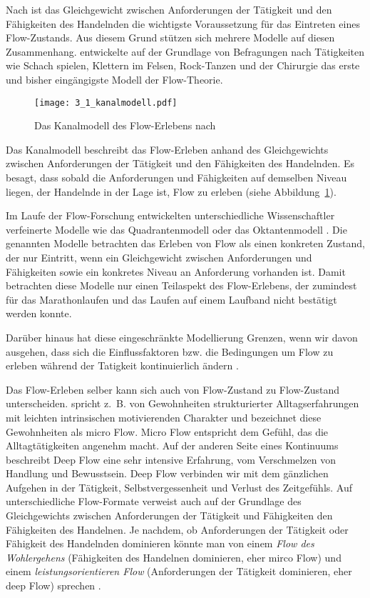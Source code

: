 Nach \citet[]{Csikszentmihalyi2010} ist das Gleichgewicht zwischen Anforderungen der Tätigkeit und den Fähigkeiten des Handelnden die wichtigste Voraussetzung für das Eintreten eines Flow-Zustands. Aus diesem Grund stützen sich mehrere Modelle auf diesen Zusammenhang. \citet[S.~75]{Csikszentmihalyi2010} entwickelte auf der Grundlage von Befragungen nach Tätigkeiten wie Schach spielen, Klettern im Felsen, Rock-Tanzen und der Chirurgie das erste und bisher eingängigste Modell der Flow-Theorie.
\begin{figure}
	[!htb] \centering 
	\texttt{[image: 3\_1\_kanalmodell.pdf]} \caption[Das Kanalmodell des Flow-Erlebens]{Das Kanalmodell des Flow-Erlebens nach \citet[S.~75]{Csikszentmihalyi2010}} \label{fig:3_1_kanalmodell} 
\end{figure}

Das Kanalmodell beschreibt das Flow-Erleben anhand des Gleichgewichts zwischen Anforderungen der Tätigkeit und den Fähigkeiten des Handelnden. Es besagt, dass sobald die Anforderungen und Fähigkeiten auf demselben Niveau liegen, der Handelnde in der Lage ist, Flow zu erleben (siehe Abbildung~\ref{fig:3_1_kanalmodell}). 

Im Laufe der Flow-Forschung entwickelten unterschiedliche Wissenschaftler verfeinerte Modelle wie das Quadrantenmodell \citep[S.~286]{Csikszentmihalyi1995} oder das Oktantenmodell \citep[S.~296]{Massimini1995}. Die genannten Modelle betrachten das Erleben von Flow als einen konkreten Zustand, der nur Eintritt, wenn ein Gleichgewicht zwischen Anforderungen und Fähigkeiten sowie ein konkretes Niveau an Anforderung vorhanden ist. Damit betrachten diese Modelle nur einen Teilaspekt des Flow-Erlebens, der zumindest für das Marathonlaufen \citep{Stoll2005} und das Laufen auf einem Laufband \citep{Reinhardt2006} nicht bestätigt werden konnte. 

Darüber hinaus hat diese eingeschränkte Modellierung Grenzen, wenn wir davon ausgehen, dass sich die Einflussfaktoren bzw. die Bedingungen um Flow zu erleben während der Tatigkeit kontinuierlich ändern \citep[][]{Grueter2016b}.

Das Flow-Erleben selber kann sich auch von Flow-Zustand zu Flow-Zustand unterscheiden. \citet[][S.~222]{Csikszentmihalyi2010} spricht z.~B. von Gewohnheiten strukturierter Alltagserfahrungen mit leichten intrinsischen motivierenden Charakter und bezeichnet diese Gewohnheiten als micro Flow. Micro Flow entspricht dem Gefühl, das die Alltagtätigkeiten angenehm macht. Auf der anderen Seite eines Kontinuums beschreibt Deep Flow eine sehr intensive Erfahrung, vom Verschmelzen von Handlung und Bewusstsein. Deep Flow verbinden wir mit dem gänzlichen Aufgehen in der Tätigkeit, Selbstvergessenheit und Verlust des Zeitgefühls. Auf unterschiedliche Flow-Formate verweist auch \citet{Moneta2012} auf der Grundlage des Gleichgewichts zwischen Anforderungen der Tätigkeit und Fähigkeiten den Fähigkeiten des Handelnen. Je nachdem, ob Anforderungen der Tätigkeit oder Fähigkeit des Handelnden dominieren könnte man von einem \emph{Flow des Wohlergehens} (Fähigkeiten des Handelnen dominieren, eher mirco Flow) und einem \emph{leistungsorientieren Flow} (Anforderungen der Tätigkeit dominieren, eher deep Flow) sprechen \citep[][]{Grueter2016b}.

